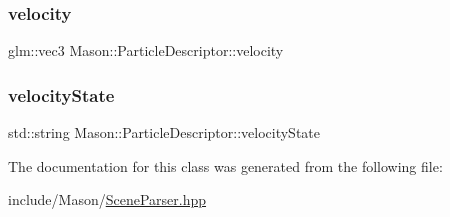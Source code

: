 \subsubsection{\texorpdfstring{velocity}{velocity}}
{\footnotesize\ttfamily glm\+::vec3 Mason\+::\+Particle\+Descriptor\+::velocity}

\hypertarget{class_mason_1_1_particle_descriptor_ac84b802189304538944403fdff16faf2}{}\label{class_mason_1_1_particle_descriptor_ac84b802189304538944403fdff16faf2} 
\subsubsection{\texorpdfstring{velocity\+State}{velocityState}}
{\footnotesize\ttfamily std\+::string Mason\+::\+Particle\+Descriptor\+::velocity\+State}



The documentation for this class was generated from the following file\+:\begin{DoxyCompactItemize}
\item 
include/\+Mason/\hyperlink{_scene_parser_8hpp}{Scene\+Parser.\+hpp}\end{DoxyCompactItemize}
